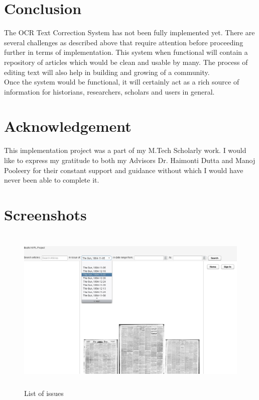 \documentclass[12pt]{article}
\begin{document}
\begin{enumerate}
\end{enumerate}

\section{Conclusion}
The OCR \cite{OCR} Text Correction System has not been fully implemented yet. There are several challenges as described above that require attention before proceeding further in terms of implementation. This system when functional will contain a repository of articles which would be clean and usable by many. The process of editing text will also help in building and growing of a community.\\
Once the system would be functional, it will certainly act as a rich source of information for historians, researchers, scholars and users in general.\\

\section{Acknowledgement}
This implementation project was a part of my M.Tech Scholarly work. I would like to express my gratitude to both my Advisors Dr. Haimonti Dutta and Manoj Pooleery for their constant support and guidance without which I would have never been able to complete it.

\nocite{cdnc,OCR,eval,noisy,book,eclipse,vaadin,tomcat,ant,postgres,svn,ER}



\appendix
\appendixpage
\addappheadtotoc

\section{Screenshots}


\begin{figure}[H]
\centering
\includegraphics[width=14cm,height=8cm]{dropdown.jpg}
\caption{List of issues}
\label{fig:5}
\end{figure}
\end{document}
